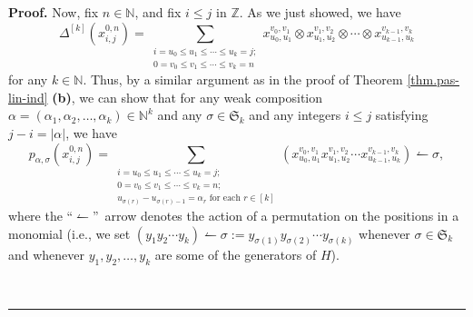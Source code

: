 \documentclass[numbers=enddot,12pt,final,onecolumn,notitlepage]{scrartcl}%
\theoremstyle{definition}
\newenvironment{proof}[1][Proof]{\noindent\textbf{#1.} }{\ \rule{0.5em}{0.5em}}
\let\sumnonlimits\sum
\renewcommand{\sum}{\sumnonlimits\limits}
\begin{document}
\begin{proof}
Now, fix $n\in\mathbb{N}$, and fix $i\leq j$ in $\mathbb{Z}$. As we just
showed, we have%
\[
\Delta^{\left[  k\right]  }\left(  x_{i,j}^{0,n}\right)  =\sum
_{\substack{i=u_{0}\leq u_{1}\leq\cdots\leq u_{k}=j;\\0=v_{0}\leq v_{1}%
\leq\cdots\leq v_{k}=n}}x_{u_{0},u_{1}}^{v_{0},v_{1}}\otimes x_{u_{1},u_{2}%
}^{v_{1},v_{2}}\otimes\cdots\otimes x_{u_{k-1},u_{k}}^{v_{k-1},v_{k}}%
\]
for any $k\in\mathbb{N}$. Thus, by a similar argument as in the proof of
Theorem \ref{thm.pas-lin-ind} \textbf{(b)}, we can show that for any weak
composition $\alpha=\left(  \alpha_{1},\alpha_{2},\ldots,\alpha_{k}\right)
\in\mathbb{N}^{k}$ and any $\sigma\in\mathfrak{S}_{k}$ and any integers $i\leq
j$ satisfying $j-i=\left\vert \alpha\right\vert $, we have
\[
p_{\alpha,\sigma}\left(  x_{i,j}^{0,n}\right)  =\sum_{\substack{i=u_{0}\leq
u_{1}\leq\cdots\leq u_{k}=j;\\0=v_{0}\leq v_{1}\leq\cdots\leq v_{k}%
=n;\\u_{\sigma\left(  r\right)  }-u_{\sigma\left(  r\right)  -1}=\alpha
_{r}\text{ for each }r\in\left[  k\right]  }}\left(  x_{u_{0},u_{1}}%
^{v_{0},v_{1}}x_{u_{1},u_{2}}^{v_{1},v_{2}}\cdots x_{u_{k-1},u_{k}}%
^{v_{k-1},v_{k}}\right)  \leftharpoonup\sigma,
\]
where the \textquotedblleft$\leftharpoonup$\textquotedblright\ arrow denotes
the action of a permutation on the positions in a monomial (i.e., we set
$\left(  y_{1}y_{2}\cdots y_{k}\right)  \leftharpoonup\sigma:=y_{\sigma\left(
1\right)  }y_{\sigma\left(  2\right)  }\cdots y_{\sigma\left(  k\right)  }$
whenever $\sigma\in\mathfrak{S}_{k}$ and whenever $y_{1},y_{2},\ldots,y_{k}$
are some of the generators of $H$).


\end{proof}
\end{document}
